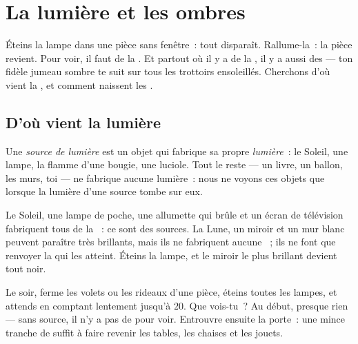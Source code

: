 \chapter{La lumière et les ombres}\label{ch:g1:light-and-shadows}

Éteins la lampe dans une pièce sans fenêtre~: tout disparaît.
Rallume-la~: la pièce revient. Pour voir, il faut de la . Et
partout où il y a de la , il y a aussi des  --- ton
fidèle jumeau sombre te suit sur tous les trottoirs ensoleillés.
Cherchons d'où vient la , et comment naissent les .

\section{D'où vient la lumière}

\begin{definition}\label{def:g1:light-and-shadows:source}
Une \emph{source de lumière} est un objet
qui fabrique sa propre \emph{lumière}~: le Soleil, une
lampe, la flamme d'une bougie, une luciole. Tout le reste --- un
livre, un ballon, les murs, toi --- ne fabrique aucune lumière~: nous
ne voyons ces objets que lorsque la lumière d'une source tombe sur
eux.
\end{definition}

\begin{example}\label{ex:g1:light-and-shadows:sources}
Le Soleil, une lampe de poche, une allumette qui brûle et un écran de
télévision fabriquent tous de la ~: ce sont des sources. La
Lune, un miroir et un mur blanc peuvent paraître très brillants, mais
ils ne fabriquent aucune ~; ils ne font que renvoyer la
 qui les atteint. Éteins la lampe, et le miroir le plus
brillant devient tout noir.
\end{example}

\begin{example}\label{ex:g1:light-and-shadows:darkroom}
Le soir, ferme les volets ou les rideaux d'une pièce, éteins toutes
les lampes, et attends en comptant lentement jusqu'à $20$. Que
vois-tu~? Au début, presque rien --- sans source, il n'y a pas de
 pour voir. Entrouvre ensuite la porte~: une mince tranche de
 suffit à faire revenir les tables, les chaises et les jouets.
\end{example}

